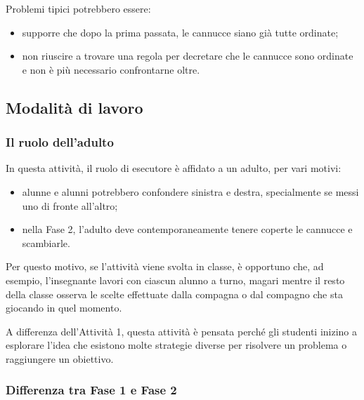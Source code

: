 \begin{attenzione}\label{aspetto-a-cui-fare-attenzione-6}


Problemi tipici potrebbero essere:


\begin{itemize}
\item
  supporre che dopo la prima passata, le cannucce siano già tutte ordinate;
\item
  non riuscire a trovare una regola per decretare che le cannucce sono ordinate e non è più necessario confrontarne oltre.
\end{itemize}
\end{attenzione}

\subsection{Modalità di lavoro }\label{modalituxe0-di-lavoro-3}

\subsubsection{Il ruolo dell'adulto}\label{importanza-dellaiutante-adulto}

In questa attività, il ruolo di esecutore è affidato a un adulto, per vari motivi:

\begin{itemize}
\item
  alunne e alunni potrebbero confondere sinistra e destra, specialmente se messi uno di fronte all'altro;
\item
  nella Fase 2, l'adulto deve contemporaneamente tenere coperte le cannucce e scambiarle.
\end{itemize}

Per questo motivo, se l'attività viene svolta in classe, è opportuno che, ad esempio, l'insegnante lavori con ciascun alunno a turno, magari mentre il resto della classe osserva le scelte effettuate dalla compagna o dal compagno che sta giocando in quel momento.

A differenza dell'Attività 1, questa attività è pensata perché gli studenti inizino a esplorare l'idea che esistono molte strategie diverse per risolvere un problema o raggiungere un obiettivo.

\subsubsection{Differenza tra Fase 1 e Fase 2}\label{differenza-tra-fase-1-e-fase-2}

